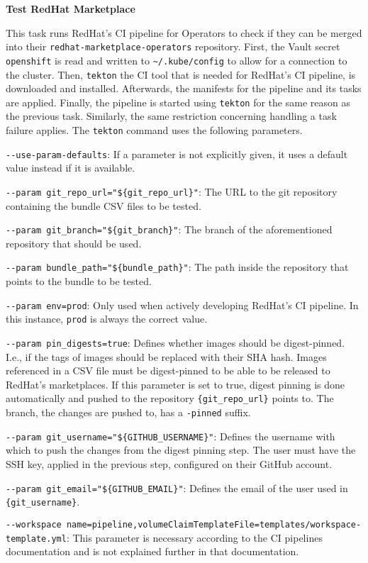 \textbf{Test RedHat Marketplace}

This task runs RedHat's CI pipeline for Operators to check if they can be merged into their \verb|redhat-marketplace-operators| repository.
First, the Vault secret \verb|openshift| is read and written to \verb|~/.kube/config| to allow for a connection to the cluster.
Then, \verb|tekton| the CI tool that is needed for RedHat's CI pipeline, is downloaded and installed.
Afterwards, the manifests for the pipeline and its tasks are applied.
Finally, the pipeline is started using \verb|tekton| for the same reason as the previous task.
Similarly, the same restriction concerning handling a task failure applies.
The \verb|tekton| command uses the following parameters.

\verb|--use-param-defaults|: If a parameter is not explicitly given, it uses a default value instead if it is available.

\verb|--param git_repo_url="${git_repo_url}"|: The URL to the git repository containing the bundle CSV files to be tested.

\verb|--param git_branch="${git_branch}"|: The branch of the aforementioned repository that should be used.

\verb|--param bundle_path="${bundle_path}"|: The path inside the repository that points to the bundle to be tested.

\verb|--param env=prod|: Only used when actively developing RedHat's CI pipeline.
In this instance, \verb|prod| is always the correct value.

\verb|--param pin_digests=true|: Defines whether images should be digest-pinned.
I.e., if the tags of images should be replaced with their SHA hash.
Images referenced in a CSV file must be digest-pinned to be able to be released to RedHat's marketplaces.
If this parameter is set to true, digest pinning is done automatically and pushed to the repository \verb|{git_repo_url}| points to.
The branch, the changes are pushed to, has a \verb|-pinned| suffix.

\verb|--param git_username="${GITHUB_USERNAME}"|: Defines the username with which to push the changes from the digest pinning step.
The user must have the SSH key, applied in the previous step, configured on their GitHub account.

\verb|--param git_email="${GITHUB_EMAIL}"|: Defines the email of the user used in \verb|{git_username}|.

\verb|--workspace name=pipeline,volumeClaimTemplateFile=templates/workspace-template.yml|: This parameter is necessary according to the CI pipelines documentation and is not explained further in that documentation.

